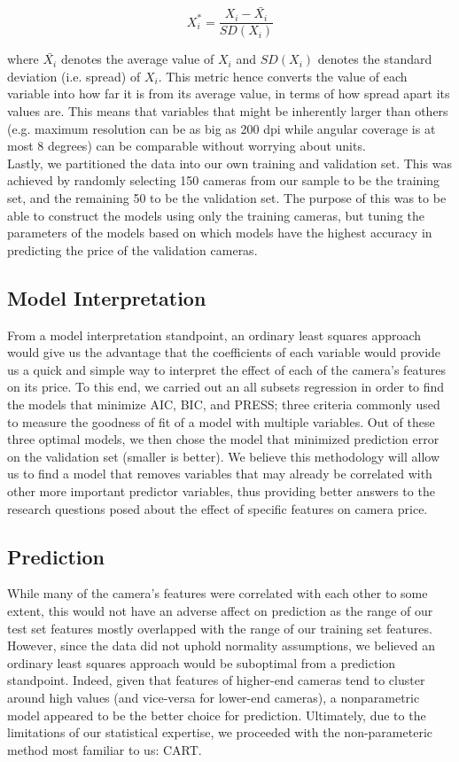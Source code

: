 \documentclass[12pt]{article}
\begin{document}
\begin{equation}
X_i^* = \frac{X_i-\bar{X_i}}{SD(X_i)}
\end{equation}

where $\bar{X_i}$ denotes the average value of $X_i$ and $SD(X_i)$ denotes the standard deviation (i.e. spread) of $X_i$. This metric hence converts the value of each variable into how far it is from its average value, in terms of how spread apart its values are. This means that variables that might be inherently larger than others (e.g. maximum resolution can be as big as 200 dpi while angular coverage is at most 8 degrees) can be comparable without worrying about units.\\

Lastly, we partitioned the data into our own training and validation set. This was achieved by randomly selecting 150 cameras from our sample to be the training set, and the remaining 50 to be the validation set. The purpose of this was to be able to construct the models using only the training cameras, but tuning the parameters of the models based on which models have the highest accuracy in predicting the price of the validation cameras.

\subsection{Model Interpretation}
From a model interpretation standpoint, an ordinary least squares approach would give us the advantage that the coefficients of each variable would provide us a quick and simple way to interpret the effect of each of the camera's features on its price. To this end, we carried out an all subsets regression in order to find the models that minimize AIC, BIC, and PRESS; three criteria commonly used to measure the goodness of fit of a model with multiple variables. Out of these three optimal models, we then chose the model that minimized prediction error on the validation set (smaller is better). We believe this methodology will allow us to find a model that removes variables that may already be correlated with other more important predictor variables, thus providing better answers to the research questions posed about the effect of specific features on camera price.

\subsection{Prediction}
While many of the camera's features were correlated with each other to some extent, this would not have an adverse affect on prediction as the range of our test set features mostly overlapped with the range of our training set features. However, since the data did not uphold normality assumptions, we believed an ordinary least squares approach would be suboptimal from a prediction standpoint. Indeed, given that features of higher-end cameras tend to cluster around high values (and vice-versa for lower-end cameras), a nonparametric model appeared to be the better choice for prediction. Ultimately, due to the limitations of our statistical expertise, we proceeded with the non-parameteric method most familiar to us: CART.
\end{document}
